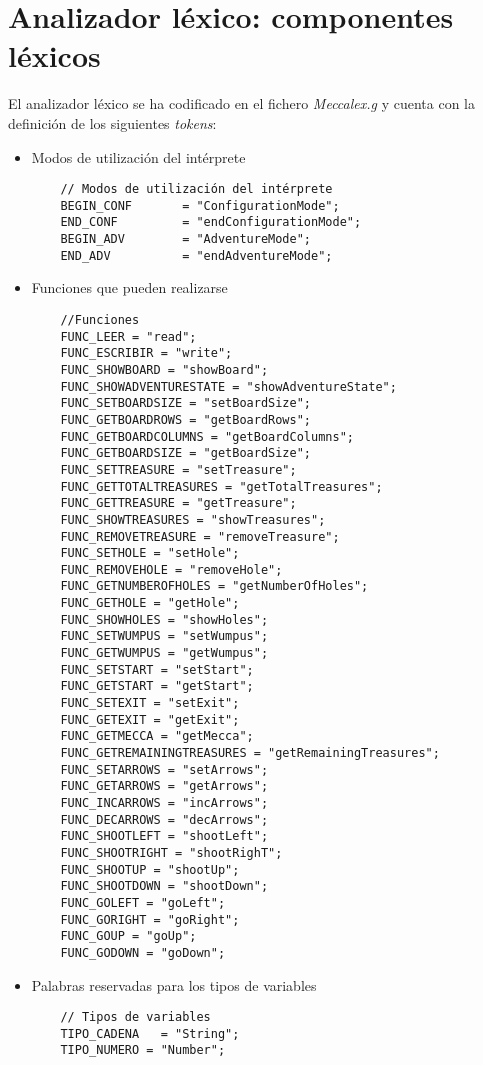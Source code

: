 \documentclass[a4paper,12pt,twoside,openright]{report}
\begin{document}
  \section{Analizador léxico: componentes léxicos}
  El analizador léxico se ha codificado en el fichero \emph{Meccalex.g} y cuenta con la definición de los siguientes \emph{tokens}:
  \begin{itemize}
   \item Modos de utilización del intérprete
   \begin{lstlisting}
    // Modos de utilización del intérprete
    BEGIN_CONF       = "ConfigurationMode";
    END_CONF         = "endConfigurationMode";
    BEGIN_ADV        = "AdventureMode";
    END_ADV          = "endAdventureMode";
   \end{lstlisting}
   
   \item Funciones que pueden realizarse
   \begin{lstlisting}
    //Funciones
    FUNC_LEER = "read";
    FUNC_ESCRIBIR = "write";
    FUNC_SHOWBOARD = "showBoard";
    FUNC_SHOWADVENTURESTATE = "showAdventureState";
    FUNC_SETBOARDSIZE = "setBoardSize";
    FUNC_GETBOARDROWS = "getBoardRows";
    FUNC_GETBOARDCOLUMNS = "getBoardColumns";
    FUNC_GETBOARDSIZE = "getBoardSize";
    FUNC_SETTREASURE = "setTreasure";
    FUNC_GETTOTALTREASURES = "getTotalTreasures";
    FUNC_GETTREASURE = "getTreasure";
    FUNC_SHOWTREASURES = "showTreasures";    
    FUNC_REMOVETREASURE = "removeTreasure";
    FUNC_SETHOLE = "setHole";
    FUNC_REMOVEHOLE = "removeHole";
    FUNC_GETNUMBEROFHOLES = "getNumberOfHoles";
    FUNC_GETHOLE = "getHole";
    FUNC_SHOWHOLES = "showHoles";
    FUNC_SETWUMPUS = "setWumpus";
    FUNC_GETWUMPUS = "getWumpus";
    FUNC_SETSTART = "setStart";
    FUNC_GETSTART = "getStart";
    FUNC_SETEXIT = "setExit";
    FUNC_GETEXIT = "getExit";
    FUNC_GETMECCA = "getMecca";
    FUNC_GETREMAININGTREASURES = "getRemainingTreasures";
    FUNC_SETARROWS = "setArrows";
    FUNC_GETARROWS = "getArrows";
    FUNC_INCARROWS = "incArrows";
    FUNC_DECARROWS = "decArrows";
    FUNC_SHOOTLEFT = "shootLeft";
    FUNC_SHOOTRIGHT = "shootRighT";
    FUNC_SHOOTUP = "shootUp";
    FUNC_SHOOTDOWN = "shootDown";
    FUNC_GOLEFT = "goLeft";
    FUNC_GORIGHT = "goRight";
    FUNC_GOUP = "goUp";
    FUNC_GODOWN = "goDown";
    \end{lstlisting}
    
  \item Palabras reservadas para los tipos de variables
  \begin{lstlisting}
    // Tipos de variables
    TIPO_CADENA   = "String";
    TIPO_NUMERO = "Number";
  \end{lstlisting}
  

\end{itemize}
\end{document}
